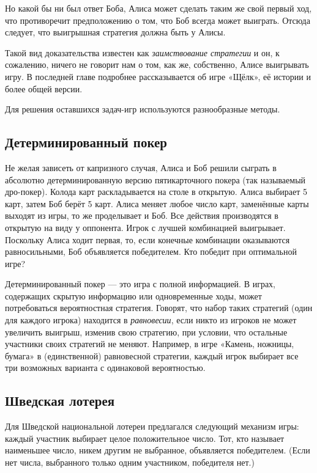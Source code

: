 Но какой бы ни был ответ Боба, Алиса может сделать таким же свой первый ход, что противоречит предположению о том, что Боб всегда может выиграть.
Отсюда следует,
что выигрышная стратегия должна быть у Алисы.
\heart

Такой вид доказательства известен как \emph{заимствование стратегии} и он, к сожалению, ничего не говорит нам о том, как же, собственно, Алисе выигрывать игру.
В последней главе подробнее рассказывается об игре «Щёлк», её истории и более общей версии.

\medskip

Для решения оставшихся задач-игр используются разнообразные методы.

\subsection*{Детерминированный покер}%

Не желая зависеть от капризного случая, Алиса и Боб решили сыграть в абсолютно детерминированную версию пятикарточного покера (так называемый дро-покер).
Колода карт раскладывается на столе в открытую.
Алиса выбирает 5 карт, затем Боб берёт 5 карт.
Алиса меняет любое число карт, заменённые карты выходят из игры, то же проделывает и Боб.
Все действия производятся в открытую на виду у оппонента.
Игрок с лучшей комбинацией выигрывает.
Поскольку Алиса ходит первая, то, если конечные комбинации оказываются равносильными, Боб объявляется победителем.
Кто победит при оптимальной игре?

\medskip

Детерминированный покер --- это игра с полной информацией.
В играх, содержащих скрытую информацию или одновременные ходы, может потребоваться вероятностная стратегия.
Говорят, что набор таких стратегий (один для каждого игрока) находится в \emph{равновесии}, если никто из игроков не может увеличить выигрыш, изменив свою стратегию, при условии, что остальные участники своих стратегий не меняют.
Например, в игре «Камень, ножницы, бумага» в (единственной) равновесной стратегии, каждый игрок выбирает все три возможных варианта с одинаковой вероятностью.

\subsection*{Шведская лотерея}%

Для Шведской национальной лотереи предлагался следующий механизм игры: каждый участник выбирает целое положительное число.
Тот, кто называет наименьшее число, никем другим не выбранное, объявляется победителем.
(Если нет числа, выбранного только одним участником, победителя нет.)


